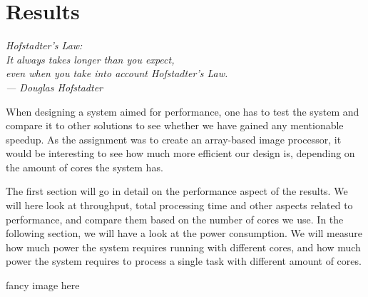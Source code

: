 \chapter{Results}\label{ch:res}

\begin{flushright}{\slshape
    Hofstadter's Law:\\
    It always takes longer than you expect,\\
    even when you take into account Hofstadter's Law.\\ \medskip
    --- Douglas Hofstadter}
\end{flushright}

When designing a system aimed for performance, one has to test the system and
compare it to other solutions to see whether we have gained any mentionable
speedup. As the assignment was to create an array-based image processor, it
would be interesting to see how much more efficient our design is, depending on
the amount of cores the system has.

The first section will go in detail on the performance aspect of the results. We
will here look at throughput, total processing time and other aspects related to
performance, and compare them based on the number of cores we use. In the
following section, we will have a look at the power consumption. We will measure
how much power the system requires running with different cores, and how much
power the system requires to process a single task with different amount of
cores.

{\sc fancy image here}



